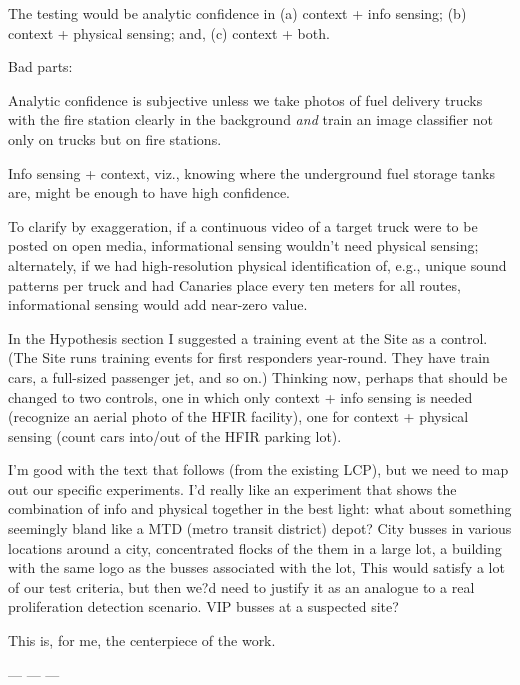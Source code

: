 \documentclass{article} %
\begin{document}
The testing would be analytic confidence in (a) context + info sensing; (b) context + physical sensing; and, (c) context + both. 

Bad parts: 
\begin{enumerate*}
\item Analytic confidence is subjective unless we take photos of fuel delivery trucks with the fire station clearly in the background \textit{and} train an image classifier not only on trucks but on fire stations. 
\item Info sensing + context, viz., knowing where the underground fuel storage tanks are, might be enough to have high confidence.
\end{enumerate*}

To clarify by exaggeration, if a continuous video of a target truck were to be posted on open media, informational sensing wouldn't need physical sensing; alternately, if we had high-resolution physical identification of, e.g., unique sound patterns per truck and had Canaries place every ten meters for all routes, informational sensing would add near-zero value. 

In the Hypothesis section I suggested a training event at the Site as a control. (The Site runs training events for first responders year-round. They have train cars, a full-sized passenger jet, and so on.) Thinking now, perhaps that should be changed to two controls, one in which only context + info sensing is needed (recognize an aerial photo of the HFIR facility), one for context + physical sensing (count cars into/out of the HFIR parking lot). 

I'm good with the text that follows (from the existing LCP), but we need to map out our specific experiments. I'd really like an experiment that shows the combination of info and physical together in the best light: what about something seemingly bland like a MTD (metro transit district) depot? City busses in various locations around a city, concentrated flocks of the them in a large lot, a building with the same logo as the busses associated with the lot, \textellipsis This would satisfy a lot of our test criteria, but then we?d need to justify it as an analogue to a real proliferation detection scenario. VIP busses at a suspected site?

This is, for me, the centerpiece of the work. 

--- --- ---

\end{document}

